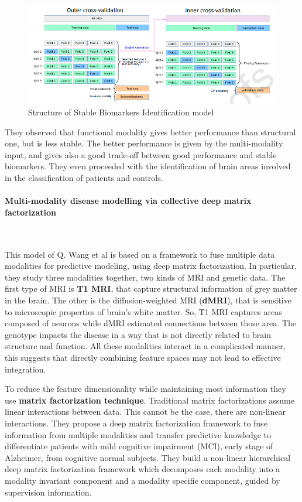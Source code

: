 \begin{figure}[htbp]
	\centering
	\includegraphics[scale=0.65]{Immagini/stablebiomarkers.PNG}
	\caption{Structure of Stable Biomarkers Identification model}
	\label{fig:diagram18}
\end{figure}

They observed that functional modality gives better performance than structural one, but is less stable. The better performance is given by the multi-modality input, and gives also a good trade-off between good performance and stable biomarkers. They even proceeded with the identification of brain areas involved in the classification of patients and controls.

\paragraph{Multi-modality disease modelling via collective deep matrix factorization}\
\vspace{0.5cm}

This model of Q. Wang et al \cite{10.1145/3097983.3098164} is based on a framework to fuse multiple data modalities for predictive modeling, using deep matrix factorization. In particular, they study three modalities together, two kinds of MRI and genetic data. The first type of MRI is \textbf{T1 MRI}, that capture structural information of grey matter in the brain. The other is the diffusion-weighted MRI (\textbf{dMRI}), that is sensitive to microscopic properties of brain's white matter. So, T1 MRI captures areas composed of neurons while dMRI estimated connections between those area. The genotype impacts the disease in a way that is not directly related to brain structure and function. All these modalities interact in a complicated manner, this suggests that directly combining feature spaces may not lead to effective integration.
\vspace{0.5cm}

To reduce the feature dimensionality while maintaining most information they use \textbf{matrix factorization technique}. Traditional matrix factorizations assume linear interactions between data. This cannot be the case, there are non-linear interactions. They propose a deep matrix factorization framework to fuse information from multiple modalities and transfer predictive knowledge to differentiate patients with mild cognitive impairment (MCI), early stage of Alzheimer, from cognitive normal subjects. They build a non-linear hierarchical deep matrix factorization framework which decomposes each modality into a modality invariant component and a modality specific component, guided by supervision information. 
\vspace{0.5cm}

